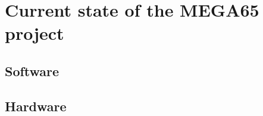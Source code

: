 
\chapter{Current state of the MEGA65 project}
\label{cha: Chapter5}

\section{Software}



\section{Hardware}
